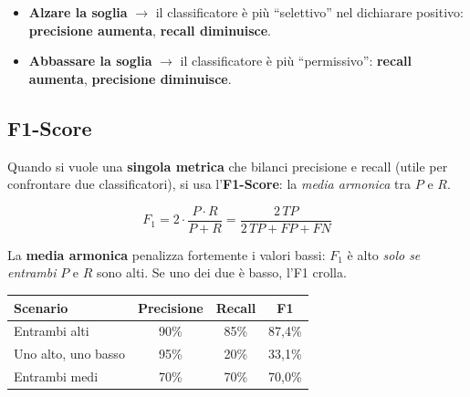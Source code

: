 \begin{center}
\end{center}

\begin{itemize}
    \item \textbf{Alzare la soglia} $\to$ il classificatore è più ``selettivo'' nel dichiarare positivo: \textbf{precisione aumenta}, \textbf{recall diminuisce}.
    \item \textbf{Abbassare la soglia} $\to$ il classificatore è più ``permissivo'': \textbf{recall aumenta}, \textbf{precisione diminuisce}.
\end{itemize}


\subsection{F1-Score}
Quando si vuole una \textbf{singola metrica} che bilanci precisione e recall (utile per confrontare due classificatori), si usa l'\textbf{F1-Score}: la \emph{media armonica} tra $P$ e $R$.

\begin{equation}
F_1 = 2 \cdot \frac{P \cdot R}{P + R} = \frac{2\,TP}{2\,TP + FP + FN}
\end{equation}

La \textbf{media armonica} penalizza fortemente i valori bassi: $F_1$ è alto \emph{solo se entrambi} $P$ e $R$ sono alti. Se uno dei due è basso, l'F1 crolla.

\begin{center}
\renewcommand{\arraystretch}{1.3}
\begin{tabular}{@{} l c c c @{}}
\toprule
\textbf{Scenario} & \textbf{Precisione} & \textbf{Recall} & \textbf{F1} \\
\midrule
Entrambi alti & 90\% & 85\% & 87{,}4\% \\
Uno alto, uno basso & 95\% & 20\% & 33{,}1\% \\
Entrambi medi & 70\% & 70\% & 70{,}0\% \\
\bottomrule
\end{tabular}
\end{center}

